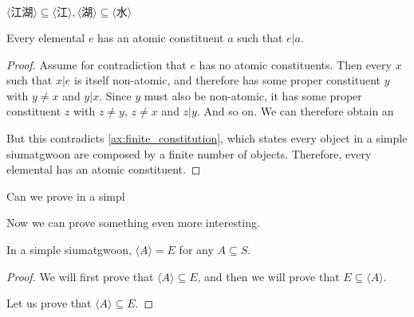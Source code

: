 $\langle \text{江湖} \rangle \subseteq \langle \text{江} \rangle,  \langle \text{湖} \rangle \subseteq \langle \text{水} \rangle$

\begin{lemma}\label{lem:every-elemental-has-an-atomic-constituent}
    Every elemental $e$ has an atomic constituent $a$ such that $e|a$.
\end{lemma}
\begin{proof}
    Assume for contradiction that $e$ has no atomic constituents. Then every $x$ such that $x|e$ is itself non-atomic, and therefore has some proper constituent $y$ with $y \neq x$ and $y|x$. Since $y$ must also be non-atomic, it has some proper constituent $z$ with $z \neq y$, $z \neq x$ and $z|y$. And so on. We can therefore obtain an 
    
    
    But this contradicts \ref{ax:finite_constitution}, which states every object in a simple siumatgwoon are composed by a finite number of objects. Therefore, every elemental has an atomic constituent.
\end{proof}


Can we prove in a simpl

Now we can prove something even more interesting. 
\begin{theorem}[$\langle A \rangle = E$ in simple siumatgwoons]\label{thm:hais-of-sets-are-siumatgwoons}
    In a simple siumatgwoon, $\langle A \rangle = E$ for any $A\subseteq S$.
\end{theorem}
\begin{proof}
    We will first prove that $\langle A \rangle \subseteq E$, and then we will prove that $E \subseteq \langle A \rangle$.

    Let us prove that $\langle A \rangle \subseteq E$.  


 
\end{proof}
